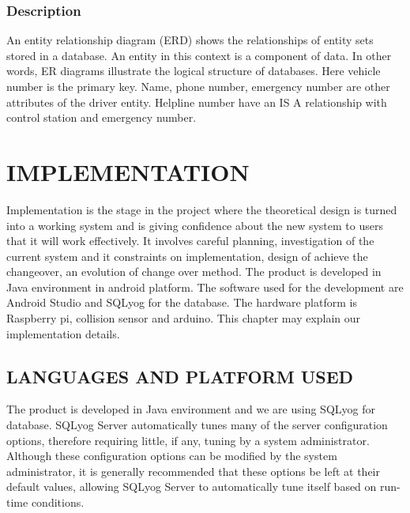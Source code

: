 \documentclass[12pt,a4paper,oneside]{report}
\begin{document}
{\subsection{Description}
\par An entity relationship diagram (ERD) shows the relationships of entity sets stored in a database. An entity in this context is a component of data. In other words, ER diagrams illustrate the logical structure of databases. Here vehicle number is the primary key. Name, phone number, emergency number are other attributes of the driver entity. Helpline number have an IS A relationship with control station and emergency number.




\chapter{IMPLEMENTATION}
Implementation is the stage in the project where the theoretical design is turned into a working system and is giving confidence about the new system to users that it will work effectively. It involves careful planning, investigation of the current system and it constraints on implementation, design of achieve the changeover, an evolution of change over method. The product is developed in Java environment in android platform. The software used for the development are Android Studio and SQLyog for the database. The hardware platform is Raspberry pi, collision sensor and arduino. This chapter may explain our implementation details.

\section{LANGUAGES AND PLATFORM USED}
\par The product is developed in Java environment and we are using SQLyog for database. SQLyog Server automatically tunes many of the server configuration options, therefore requiring little, if any, tuning by a system administrator. Although these configuration options can be modified by the system administrator, it is generally recommended that these options be left at their default values, allowing SQLyog Server to automatically tune itself based on run-time conditions.

}
\end{document}
